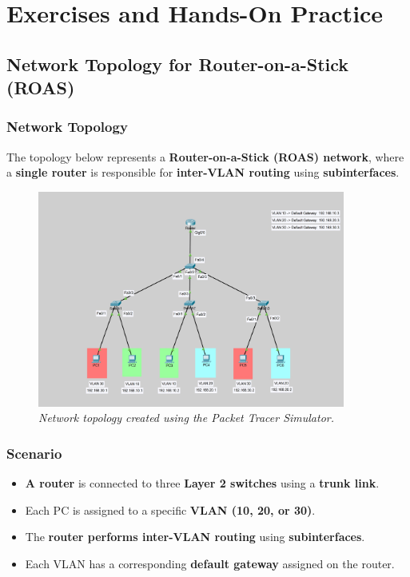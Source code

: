 \documentclass[a4paper]{book}
\begin{document}
\part{Exercises and Hands-On Practice}

\chapter{Network Topology for Router-on-a-Stick (ROAS)}

\section{Network Topology}
The topology below represents a \textbf{Router-on-a-Stick (ROAS) network}, where a \textbf{single router} is responsible for \textbf{inter-VLAN routing} using \textbf{subinterfaces}.

\begin{figure}[h]
    \centering
    \includegraphics[width=0.9\textwidth]{ROAS.jpg}
    \caption{\textit{Network topology created using the Packet Tracer Simulator.}}

    \label{fig:packet_tracer_topology}
\end{figure}
\vspace{1cm}

\section{Scenario}
\begin{itemize}
    \item \textbf{A router} is connected to three \textbf{Layer 2 switches} using a \textbf{trunk link}.
    \item Each PC is assigned to a specific \textbf{VLAN (10, 20, or 30)}.
    \item The \textbf{router performs inter-VLAN routing} using \textbf{subinterfaces}.
    \item Each VLAN has a corresponding \textbf{default gateway} assigned on the router.
\end{itemize}
\end{document}
